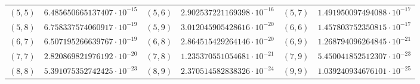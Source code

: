 {\begin{longtable}{rlrlrl}
$(5,5)$ & $6.485650665137407\cdot10^{-15}$ & $(5,6)$ & $2.902537221169398\cdot10^{-16}$ & $(5,7)$ & $1.491950097494088\cdot10^{-17}$\\
$(5,8)$ & $6.758337574060917\cdot10^{-19}$ & $(5,9)$ & $3.012045905428616\cdot10^{-20}$ & $(6,6)$ & $1.457803752350815\cdot10^{-17}$\\
$(6,7)$ & $6.507195266639767\cdot10^{-19}$ & $(6,8)$ & $2.864515429264146\cdot10^{-20}$ & $(6,9)$ & $1.268794096264845\cdot10^{-21}$\\
$(7,7)$ & $2.820869821976192\cdot10^{-20}$ & $(7,8)$ & $1.235370551054681\cdot10^{-21}$ & $(7,9)$ & $5.450041852512307\cdot10^{-23}$\\
$(8,8)$ & $5.391075352742425\cdot10^{-23}$ & $(8,9)$ & $2.370514582838326\cdot10^{-24}$ & $(9,9)$ & $1.039240934676101\cdot10^{-25}$\\
\bottomrule
\end{longtable}}

